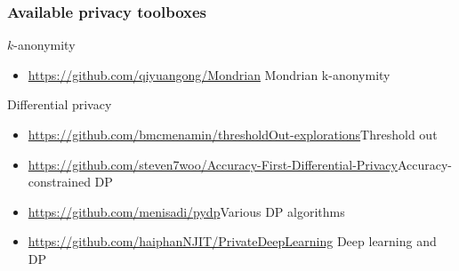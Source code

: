 \begin{frame}
  \frametitle{Available privacy toolboxes}
  \begin{block}{$k$-anonymity}
    \begin{itemize}
    \item \url{https://github.com/qiyuangong/Mondrian} Mondrian k-anonymity
    \end{itemize}
  \end{block}
  \begin{block}{Differential privacy}
    \begin{itemize}
    \item \url{https://github.com/bmcmenamin/thresholdOut-explorations}{Threshold out}
    \item \url{https://github.com/steven7woo/Accuracy-First-Differential-Privacy}{Accuracy-constrained DP}
      \item \url{https://github.com/menisadi/pydp}{Various DP algorithms}
\item \url{https://github.com/haiphanNJIT/PrivateDeepLearning} Deep learning and DP
    \end{itemize}
  \end{block}
\end{frame}

